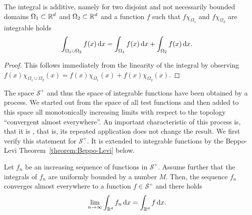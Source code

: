 \begin{corollary}
  The integral is additive, namely for two disjoint and not
  necessarily bounded domains
  $\Omega_1\subset\mathbb R^d$ and $\Omega_2\subset\mathbb R^d$ and a
  function $f$ such that $f\chi_{\Omega_1}$ and $f\chi_{\Omega_2}$ are
  integrable holds
  \begin{gather*}
    \int_{\Omega_1\cup\Omega_2} f(x)\,\mathrm{d} x
    = \int_{\Omega_1} f(x)\,\mathrm{d} x + \int_{\Omega_2} f(x)\,\mathrm{d} x.
  \end{gather*}
\end{corollary}

\begin{proof}
  This follows immediately from the linearity of the integral by
  observing $f(x)\chi_{\Omega_1\cup\Omega_2}(x) =
  f(x)\chi_{\Omega_1}(x)+f(x)\chi_{\Omega_2}(x)$.
\end{proof}

\begin{remark}
  The space $\mathcal S^+$ and thus the space of integrable functions
  have been obtained by a  process. We started
  out from the space of all test functions and then added to this
  space all monotonically increasing limits with respect to the
  topology ``convergent almost everywhere''. An important
  characteristic of this process is, that it is ,
  that is, its repeated application does not change the result. We
  first verify this statement for $\mathcal S^+$. It is extended to
  integrable functions by the Beppo-Levi
  Theorem~\ref{theorem:Beppo-Levi} below.
\end{remark}

\begin{lemma}
  Let $f_n$ be an increasing sequence of functions in $\mathcal
  S^+$. Assume further that the integrals of $f_n$ are uniformly
  bounded by a number $M$. Then, the sequence $f_n$ converges almost
  everywhere to a function $f\in\mathcal S^+$ and there holds
  \begin{gather*}
    \lim_{n\to\infty} \int_{\mathbb R^d} f_n \,\mathrm{d} x = \int_{\mathbb R^d} f \,\mathrm{d} x.
  \end{gather*}
\end{lemma}

